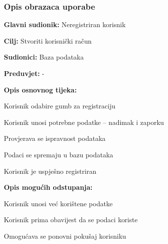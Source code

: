 				
				\subsubsection{Opis obrazaca uporabe}
					

					\noindent {}
					\begin{packed_item}
	
						\item \textbf{Glavni sudionik: }Neregistriran korisnik
						\item  \textbf{Cilj:} Stvoriti korisnički račun
						\item  \textbf{Sudionici:} Baza podataka
						\item  \textbf{Preduvjet:} -
						\item  \textbf{Opis osnovnog tijeka:}
						
						\item[] \begin{packed_enum}
	
							    \item Korisnik odabire gumb za registraciju
    							\item Korisnik unosi potrebne podatke – nadimak i zaporku
    							\item Provjerava se ispravnost podataka
    							\item Podaci se spremaju u bazu podataka
   								 \item Korisnik je uspješno registriran 
						\end{packed_enum}
						
						\item  \textbf{Opis mogućih odstupanja:}
						
						\item[] \begin{packed_item}
	
							\item[2.b] Korisnik unosi već korištene podatke
							\item[] \begin{packed_enum}
								
								\item Korisnik prima obavijest da se podaci koriste
								\item Omogućava se ponovni pokušaj korisniku
								
							\end{packed_enum}
							
						\end{packed_item}
					\end{packed_item}


